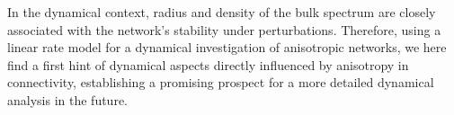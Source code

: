 In the dynamical context, radius and density of the bulk spectrum are
closely associated with the network's stability under
perturbations. Therefore, using a linear rate model for a dynamical
investigation of anisotropic networks, we here find a first hint of
dynamical aspects directly influenced by anisotropy in connectivity,
establishing a promising prospect for a more detailed dynamical
analysis in the future.














% 
% 














